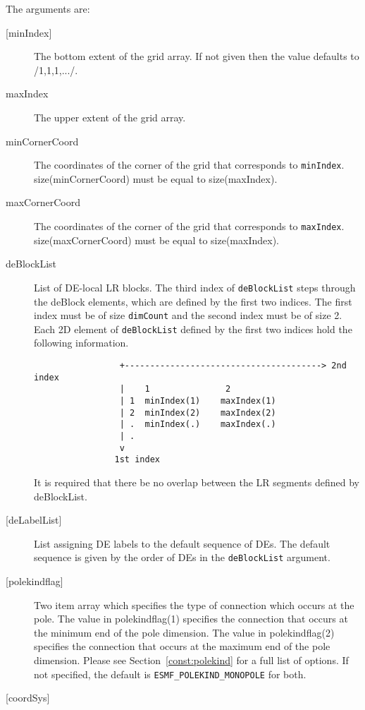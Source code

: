    The arguments are:
   \begin{description}
   \item[{[minIndex]}]
        The bottom extent of the grid array. If not given then the value defaults
        to /1,1,1,.../.
   \item[maxIndex]
        The upper extent of the grid array.
   \item[minCornerCoord]
        The coordinates of the corner of the grid that corresponds to {\tt minIndex}.
        size(minCornerCoord) must be equal to size(maxIndex).
   \item[maxCornerCoord]
        The coordinates of the corner of the grid that corresponds to {\tt maxIndex}.
        size(maxCornerCoord) must be equal to size(maxIndex).
   \item[deBlockList]
        List of DE-local LR blocks. The third index of {\tt deBlockList}
        steps through the deBlock elements, which are defined by the first
        two indices. The first index must be of size {\tt dimCount} and the
        second index must be of size 2. Each 2D element of {\tt deBlockList}
        defined by the first two indices hold the following information.
        \begin{verbatim}
                 +---------------------------------------> 2nd index
                 |    1               2
                 | 1  minIndex(1)    maxIndex(1)
                 | 2  minIndex(2)    maxIndex(2)
                 | .  minIndex(.)    maxIndex(.)
                 | .
                 v
                1st index
        \end{verbatim}
        It is required that there be no overlap between the LR segments
        defined by deBlockList.
   \item[{[deLabelList]}]
        List assigning DE labels to the default sequence of DEs. The default
        sequence is given by the order of DEs in the {\tt deBlockList}
        argument.
   \item[{[polekindflag]}]
        Two item array which specifies the type of connection which occurs at the pole. The value in polekindflag(1)
        specifies the connection that occurs at the minimum end of the pole dimension. The value in polekindflag(2)
        specifies the connection that occurs at the maximum end of the pole dimension. Please see
        Section~\ref{const:polekind} for a full list of options. If not specified,
        the default is {\tt ESMF\_POLEKIND\_MONOPOLE} for both.
   \item[{[coordSys]}]

\end{description}

